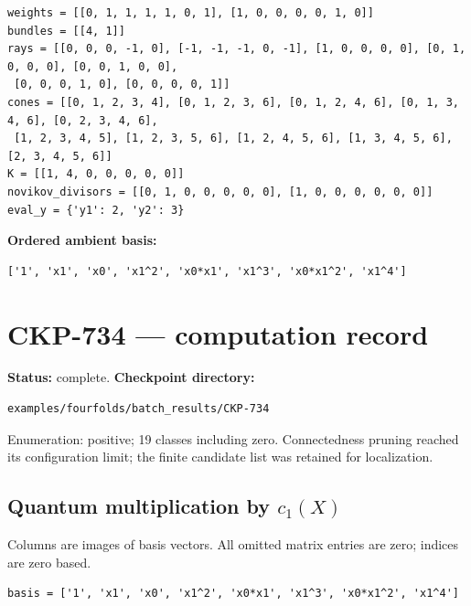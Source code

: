 \documentclass[10pt,a4paper]{article}
\begin{document}
\begin{lstlisting}
weights = [[0, 1, 1, 1, 1, 0, 1], [1, 0, 0, 0, 0, 1, 0]]
bundles = [[4, 1]]
rays = [[0, 0, 0, -1, 0], [-1, -1, -1, 0, -1], [1, 0, 0, 0, 0], [0, 1, 0, 0, 0], [0, 0, 1, 0, 0],
 [0, 0, 0, 1, 0], [0, 0, 0, 0, 1]]
cones = [[0, 1, 2, 3, 4], [0, 1, 2, 3, 6], [0, 1, 2, 4, 6], [0, 1, 3, 4, 6], [0, 2, 3, 4, 6],
 [1, 2, 3, 4, 5], [1, 2, 3, 5, 6], [1, 2, 4, 5, 6], [1, 3, 4, 5, 6], [2, 3, 4, 5, 6]]
K = [[1, 4, 0, 0, 0, 0, 0]]
novikov_divisors = [[0, 1, 0, 0, 0, 0, 0], [1, 0, 0, 0, 0, 0, 0]]
eval_y = {'y1': 2, 'y2': 3}
\end{lstlisting}

\textbf{Ordered ambient basis:}
\begin{lstlisting}
['1', 'x1', 'x0', 'x1^2', 'x0*x1', 'x1^3', 'x0*x1^2', 'x1^4']
\end{lstlisting}

\clearpage\section*{CKP-734 --- computation record}
\textbf{Status:} complete.
\textbf{Checkpoint directory:}
\begin{lstlisting}
examples/fourfolds/batch_results/CKP-734
\end{lstlisting}

Enumeration: positive; 19 classes including zero.
Connectedness pruning reached its configuration limit; the finite candidate list was retained for localization.
\subsection*{Quantum multiplication by $c_1(X)$}
Columns are images of basis vectors. All omitted matrix entries are zero; indices are zero based.

\begin{lstlisting}
basis = ['1', 'x1', 'x0', 'x1^2', 'x0*x1', 'x1^3', 'x0*x1^2', 'x1^4']
\end{lstlisting}
\end{document}

